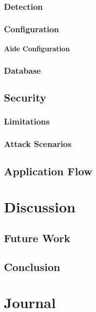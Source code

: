 \documentclass[
	a4paper,					%
	10pt,							%
	twoside,					%
	openright,				%
	notitlepage,			%
	parskip=half,			%
]{scrreprt}					%
\begin{document}
\subsection{Detection}

\subsection{Configuration}

\subsubsection{Aide Configuration}
\label{sec:aide:config}

\subsection{Database}

\section{Security}

\subsection{Limitations}

\subsection{Attack Scenarios}
\label{sec:attack_scenarios}

\section{Application Flow}

\chapter{Discussion}

\section{Future Work}

\section{Conclusion}

\chapter{Journal}
\end{document}
